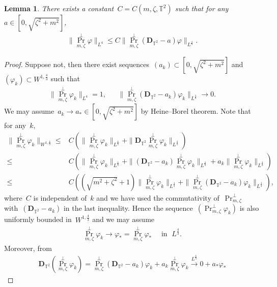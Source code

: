 \documentclass[10pt,a4paper]{amsart}
\newcommand{\T}{\mathbb{T}}
\newcommand{\pD}{\mathbf{D}}
\newcommand{\parenthesis}[1]{\left(#1\right)} %
\DeclareMathOperator{\proj}{Pr}
\newtheorem{lemma}[thm]{Lemma}
\begin{document}
\begin{lemma}\label{lemma:invertibility-orthogonal}
    There exists a constant~$C=C(m,\zeta,\mathbb{T}^2)$ such that for any~$a\in [0,\sqrt{\zeta^2+m^2}]$, 
    \begin{align}
        \|\proj_{m,\zeta}^\perp \varphi\|_{L^4}\leq C\|\proj_{m,\zeta}^\perp(\pD_{\T^2}-a)\varphi\|_{L^{\frac{4}{3}}}.
    \end{align}
\end{lemma}

\begin{proof}
    Suppose not, then there exist sequences~$(a_k)\subset [0,\sqrt{\zeta^2+m^2}]$ and~$(\varphi_k)\subset W^{1,\frac{4}{3}}$ such that
        \begin{align}
            \|\proj_{m,\zeta}^\perp\varphi_k\|_{L^4}=1, & &
            \|\proj_{m,\zeta}^\perp(\pD_{\T^2}-a_k)\varphi_k\|_{L^{\frac{4}{3}}}\to 0.
        \end{align}
        We may assume~$a_k\to a_*\in [0,\sqrt{\zeta^2+m^2}]$ by Heine--Borel theorem. 
        Note that for any~$k$,
        \begin{align}
            \|\proj_{m,\zeta}^\perp \varphi_k \|_{W^{1,\frac{4}{3}}}
            \leq& C \parenthesis{ \| \proj_{m,\zeta}^\perp \varphi_k\|_{L^{\frac{4}{3}}} + \|\pD_{\T^2}\proj_{m,\zeta}^\perp \varphi_k\|_{L^{\frac{4}{3}}} } \\
            \leq& C \parenthesis{
            \| \proj_{m,\zeta}^\perp \varphi_k\|_{L^{\frac{4}{3}}}
            + \|(\pD_{\T^2}-a_k)\proj_{m,\zeta}^\perp \varphi_k\|_{L^{\frac{4}{3}}} 
            + a_k\|\proj_{m,\zeta}^\perp \varphi_k\|_{L^{\frac{4}{3}}} } \\
            \leq& C \parenthesis{ (\sqrt{m^2+\zeta^2}+1)\| \proj_{m,\zeta}^\perp \varphi_k\|_{L^{\frac{4}{3}}} + \|\proj_{m,\zeta}^\perp (\pD_{\T^2}-a_k)\varphi_k\|_{L^{\frac{4}{3}}} },
        \end{align}
        where~$C$ is independent of~$k$ and we have used the commutativity of~$\proj_{m,\zeta}^\perp$ with~$(\pD_{\T^2}-a_k)$ in the last inequality.
        Hence the sequence~$(\proj_{m,\zeta}^\perp \varphi_k)$ is also uniformly bounded in~$W^{1,\frac{4}{3}}$ and we may assume
        \begin{align}
            \proj_{m,\zeta}^\perp\varphi_k \to \varphi_*=\proj_{m,\zeta}^\perp \varphi_*\quad  \mbox{ in } \;  L^{\frac{4}{3}}.
        \end{align}
        Moreover, from
        \begin{align}
            \pD_{\T^2}(\proj_{m,\zeta}^\perp\varphi_k)= \proj_{m,\zeta}^\perp (\pD_{\T^2}-a_k)\varphi_k+ a_k \proj_{m,\zeta}^\perp\varphi_k \xrightarrow{L^{\frac{4}{3}}} 0+ a_*\varphi_*

\end{align}
\end{proof}
\end{document}
